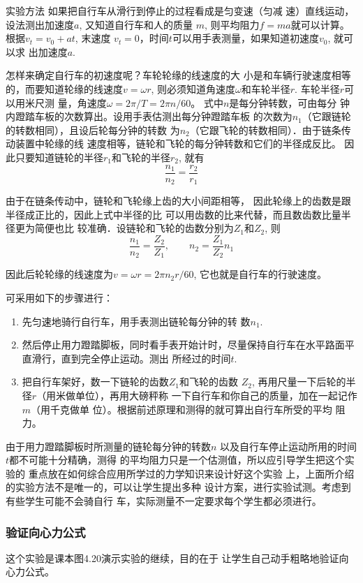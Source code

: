 实验方法
如果把自行车从滑行到停止的过程看成是匀变速（匀减
速）直线运动，设法测出加速度$a$, 又知道自行车和人的质量
$m$, 则平均阻力$f=ma$就可以计算。根据$v_t=v_0+at$, 末速度
$v_t=0$，时间$t$可以用手表测量，如果知道初速度$v_0$, 就可以求
出加速度$a$.

怎样来确定自行车的初速度呢？车轮轮缘的线速度的大
小是和车辆行驶速度相等的，而要知道轮缘的线速度$v=\omega r$,
则必须知道角速度$\omega$和车轮半径$r$. 车轮半径$r$可以用米尺测
量，角速度$ω=2\pi/T=2\pi n/60$。
式中$n$是每分钟转数，可由每分
钟内蹬踏车板的次数算出。设用手表估测出每分钟蹬踏车板
的次数为$n_1$（它跟链轮的转数相同），且设后轮每分钟的转数
为$n_2$（它跟飞轮的转数相同）．由于链条传动装置中轮缘的线
速度相等，链轮和飞轮的每分钟转数和它们的半径成反比。
因此只要知道链轮的半径$r_1$和飞轮的半径$r_2$, 就有
\[\frac{n_1}{n_2}=\frac{r_2}{r_1}\]

由于在链条传动中，链轮和飞轮缘上齿的大小间距相等，
因此轮缘上的齿数是跟半径成正比的，因此上式中半径的比
可以用齿数的比来代替，而且数齿数比量半径更为简便也比
较准确．设链轮和飞轮的齿数分别为$Z_1$和$Z_2$, 则
\[\frac{n_1}{n_2}=\frac{Z_2}{Z_1},\qquad n_2=\frac{Z_1}{Z_2}n_1\]

因此后轮轮缘的线速度为$v=\omega r=2\pi n_2r/60$, 
它也就是自行车的行驶速度。

可采用如下的步骤进行：
\begin{enumerate}
    \item 先匀速地骑行自行车，用手表测出链轮每分钟的转
数$n_1$.
\item 然后停止用力蹬踏脚板，同时看手表开始计时，尽量保持自行车在水平路面平直滑行，直到完全停止运动。测出
所经过的时间$t$.
\item 把自行车架好，数一下链轮的齿数$Z_1$和飞轮的齿数
$Z_2$, 再用尺量一下后轮的半径$r$（用米做单位），再用大磅秤称
一下自行车和你自己的质量，加在一起记作$m$（用千克做单
位）。根据前述原理和测得的就可算出自行车所受的平均
阻力。
\end{enumerate}

由于用力蹬踏脚板时所测量的链轮每分钟的转数$n$
以及自行车停止运动所用的时间$t$都不可能十分精确，测得
的平均阻力只是一个估测值，所以应引导学生把这个实验的
重点放在如何综合应用所学过的力学知识来设计好这个实验
上，上面所介绍的实验方法不是唯一的，可以让学生提出多种
设计方案，进行实验试测。考虑到有些学生可能不会骑自行
车，实际测量不一定要求每个学生都必须进行。

\subsubsection{验证向心力公式}
这个实验是课本图4.20演示实验的继续，目的在于
让学生自己动手粗略地验证向心力公式。

